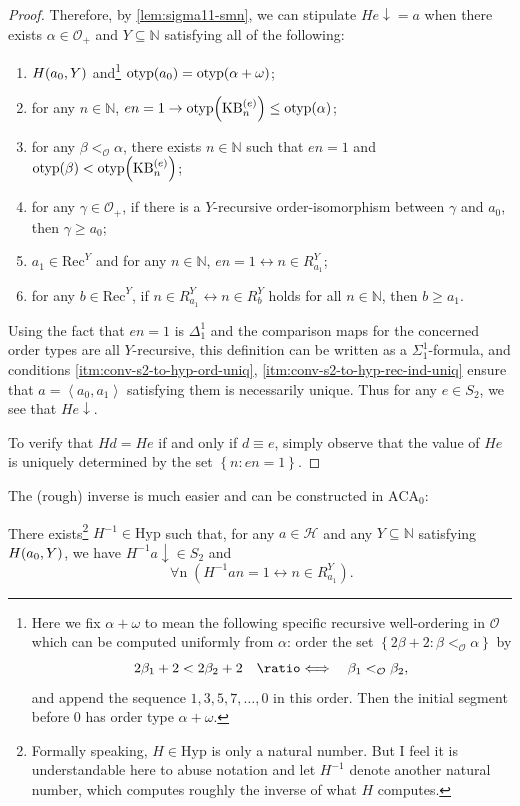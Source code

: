 \documentclass[12pt,openany]{book}
\theoremstyle{plain}
\theoremstyle{definition}
\newcommand\uplabel[1]{\textup{(#1)}}
\newcommand\tuple[1]{\left\langle #1 \right\rangle}
\newcommand\opA[1]{\mathop{\forall #1}}
\newcommand\defeqv{\quad \ratio\Longleftrightarrow \quad}
\DeclareMathOperator\otyp{otyp}
\newcommand\ACA{\mathrm{ACA}}
\newcommand\Hyp{\mathrm{Hyp}}
\newcommand\Rec{\mathrm{Rec}}
\newcommand\KB{\mathrm{KB}}
\begin{document}
\begin{proof}
  Therefore, by \autoref{lem:sigma11-smn}, we can stipulate $He {\downarrow} = a$ when there exists $\alpha \in \mathcal{O}_+$ and $Y \subseteq \mathbb{N}$ satisfying all of the following:
  \begin{enumerate}[label=\uplabel{\roman*}]
    \item $H\mleft(a_0, Y\mright)$ and\footnote{Here we fix $\alpha + \omega$ to mean the following specific recursive well-ordering in $\mathcal{O}$ which can be computed uniformly from $\alpha$: order the set $\left\{2\beta + 2 : \beta <_\mathcal{O} \alpha\right\}$ by
            \[2\beta_1 + 2 < 2\beta_2 + 2 \defeqv \beta_1 <_\mathcal{O} \beta_2,\]
            and append the sequence $1, 3, 5, 7, \ldots, 0$ in this order. Then the initial segment before $0$ has order type $\alpha + \omega$.} $\otyp\mleft(a_0\mright) = \otyp\mleft(\alpha + \omega\mright)$;
    \item for any $n \in \mathbb{N}$, $en = 1 \rightarrow \otyp\mleft(\KB^{(e)}_n\mright) \leq \otyp\mleft(\alpha\mright)$;
    \item \label{itm:conv-s2-to-hyp-ord-uniq} for any $\beta <_\mathcal{O} \alpha$, there exists $n \in \mathbb{N}$ such that $en = 1$ and $\otyp\mleft(\beta\mright) < \otyp\mleft(\KB^{(e)}_n\mright)$;
    \item for any $\gamma \in \mathcal{O}_+$, if there is a $Y$-recursive order-isomorphism between $\gamma$ and $a_0$, then $\gamma \geq a_0$;
    \item $a_1 \in \Rec^Y$ and for any $n \in \mathbb{N}$, $en = 1 \leftrightarrow n \in R^Y_{a_1}$;
    \item \label{itm:conv-s2-to-hyp-rec-ind-uniq} for any $b \in \Rec^Y$, if $n \in R^Y_{a_1} \leftrightarrow n \in R^Y_b$ holds for all $n \in \mathbb{N}$, then $b \geq a_1$.
  \end{enumerate}
  Using the fact that $en = 1$ is $\Delta^1_1$ and the comparison maps for the concerned order types are all $Y$-recursive, this definition can be written as a $\Sigma^1_1$-formula, and conditions \ref{itm:conv-s2-to-hyp-ord-uniq}, \ref{itm:conv-s2-to-hyp-rec-ind-uniq} ensure that $a = \tuple{a_0, a_1}$ satisfying them is necessarily unique. Thus for any $e \in S_2$, we see that $He {\downarrow}$.

  To verify that $Hd = He$ if and only if $d \equiv e$, simply observe that the value of $He$ is uniquely determined by the set $\left\{n : en = 1\right\}$.
\end{proof}

The (rough) inverse is much easier and can be constructed in $\ACA_0$:
\begin{proposition}
  There exists\footnote{Formally speaking, $H \in \Hyp$ is only a natural number. But I feel it is understandable here to abuse notation and let $H^{-1}$ denote another natural number, which computes roughly the inverse of what $H$ computes.} $H^{-1} \in \Hyp$ such that, for any $a \in \mathcal{H}$ and any $Y \subseteq \mathbb{N}$ satisfying $H\mleft(a_0, Y\mright)$, we have $H^{-1} a {\downarrow} \in S_2$ and
  \[\opA{n} \left(H^{-1} an = 1 \leftrightarrow n \in R^Y_{a_1}\right).\]
\end{proposition}
\end{document}
